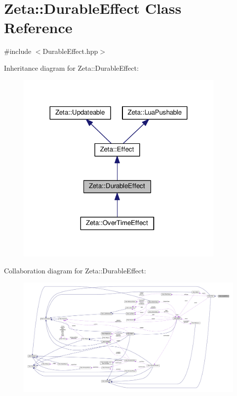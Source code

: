 \hypertarget{classZeta_1_1DurableEffect}{\section{Zeta\+:\+:Durable\+Effect Class Reference}
\label{classZeta_1_1DurableEffect}
}


{\ttfamily \#include $<$Durable\+Effect.\+hpp$>$}



Inheritance diagram for Zeta\+:\+:Durable\+Effect\+:\nopagebreak
\begin{figure}[H]
\begin{center}
\leavevmode
\includegraphics[width=288pt]{classZeta_1_1DurableEffect__inherit__graph}
\end{center}
\end{figure}


Collaboration diagram for Zeta\+:\+:Durable\+Effect\+:
\nopagebreak
\begin{figure}[H]
\begin{center}
\leavevmode
\includegraphics[width=350pt]{classZeta_1_1DurableEffect__coll__graph}
\end{center}
\end{figure}
